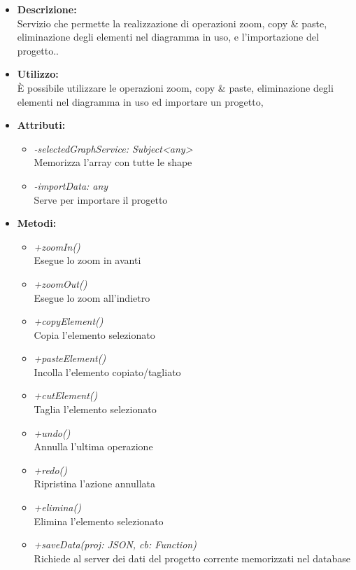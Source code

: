 \begin{itemize}
	\item \textbf{Descrizione:}\\
	Servizio che permette la realizzazione di operazioni zoom, copy & paste, eliminazione degli elementi nel diagramma in uso, e l’importazione del progetto..
	\item \textbf{Utilizzo:}\\
	È possibile utilizzare le operazioni zoom, copy & paste, eliminazione degli elementi nel diagramma in uso ed importare un progetto,
	\item \textbf{Attributi:}
		\begin{itemize}
			\item \emph{-selectedGraphService: Subject<any>}\\
			Memorizza l'array con tutte le shape
			\item \emph{-importData: any}\\
			Serve per importare il progetto
		\end{itemize}
	\item \textbf{Metodi:}
		\begin{itemize}
			\item \emph{+zoomIn()}\\
    		Esegue lo zoom in avanti
    		\item \emph{+zoomOut()}\\
    		Esegue lo zoom all'indietro
    		\item \emph{+copyElement()}\\
    		Copia l'elemento selezionato
    		\item \emph{+pasteElement()}\\
    		Incolla l'elemento copiato/tagliato
    		\item \emph{+cutElement()}\\
    		Taglia l'elemento selezionato
    		\item \emph{+undo()}\\
    		Annulla l'ultima operazione
    		\item \emph{+redo()}\\
    		Ripristina l'azione annullata
    		\item \emph{+elimina()}\\
    		Elimina l'elemento selezionato
    		\item \emph{+saveData(proj: JSON, cb: Function)}\\
    		Richiede al server dei dati del progetto corrente memorizzati nel database\\

\end{itemize}
\end{itemize}
